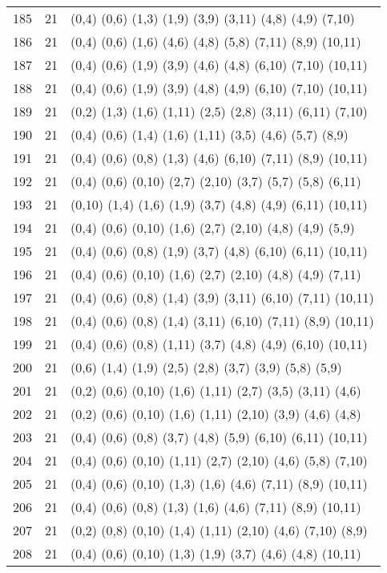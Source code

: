 {\begin{longtable}{lll}
185 & 21 & (0,4) (0,6) (1,3) (1,9) (3,9) (3,11) (4,8) (4,9) (7,10) \\
186 & 21 & (0,4) (0,6) (1,6) (4,6) (4,8) (5,8) (7,11) (8,9) (10,11) \\
187 & 21 & (0,4) (0,6) (1,9) (3,9) (4,6) (4,8) (6,10) (7,10) (10,11) \\
188 & 21 & (0,4) (0,6) (1,9) (3,9) (4,8) (4,9) (6,10) (7,10) (10,11) \\
189 & 21 & (0,2) (1,3) (1,6) (1,11) (2,5) (2,8) (3,11) (6,11) (7,10) \\
190 & 21 & (0,4) (0,6) (1,4) (1,6) (1,11) (3,5) (4,6) (5,7) (8,9) \\
191 & 21 & (0,4) (0,6) (0,8) (1,3) (4,6) (6,10) (7,11) (8,9) (10,11) \\
192 & 21 & (0,4) (0,6) (0,10) (2,7) (2,10) (3,7) (5,7) (5,8) (6,11) \\
193 & 21 & (0,10) (1,4) (1,6) (1,9) (3,7) (4,8) (4,9) (6,11) (10,11) \\
194 & 21 & (0,4) (0,6) (0,10) (1,6) (2,7) (2,10) (4,8) (4,9) (5,9) \\
195 & 21 & (0,4) (0,6) (0,8) (1,9) (3,7) (4,8) (6,10) (6,11) (10,11) \\
196 & 21 & (0,4) (0,6) (0,10) (1,6) (2,7) (2,10) (4,8) (4,9) (7,11) \\
197 & 21 & (0,4) (0,6) (0,8) (1,4) (3,9) (3,11) (6,10) (7,11) (10,11) \\
198 & 21 & (0,4) (0,6) (0,8) (1,4) (3,11) (6,10) (7,11) (8,9) (10,11) \\
199 & 21 & (0,4) (0,6) (0,8) (1,11) (3,7) (4,8) (4,9) (6,10) (10,11) \\
200 & 21 & (0,6) (1,4) (1,9) (2,5) (2,8) (3,7) (3,9) (5,8) (5,9) \\
201 & 21 & (0,2) (0,6) (0,10) (1,6) (1,11) (2,7) (3,5) (3,11) (4,6) \\
202 & 21 & (0,2) (0,6) (0,10) (1,6) (1,11) (2,10) (3,9) (4,6) (4,8) \\
203 & 21 & (0,4) (0,6) (0,8) (3,7) (4,8) (5,9) (6,10) (6,11) (10,11) \\
204 & 21 & (0,4) (0,6) (0,10) (1,11) (2,7) (2,10) (4,6) (5,8) (7,10) \\
205 & 21 & (0,4) (0,6) (0,10) (1,3) (1,6) (4,6) (7,11) (8,9) (10,11) \\
206 & 21 & (0,4) (0,6) (0,8) (1,3) (1,6) (4,6) (7,11) (8,9) (10,11) \\
207 & 21 & (0,2) (0,8) (0,10) (1,4) (1,11) (2,10) (4,6) (7,10) (8,9) \\
208 & 21 & (0,4) (0,6) (0,10) (1,3) (1,9) (3,7) (4,6) (4,8) (10,11) \\

\end{longtable}}
